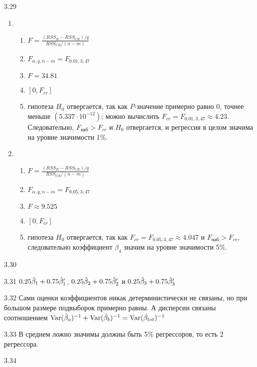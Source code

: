 \begin{solution}{{3.29}}
\begin{enumerate}
\item
\begin{enumerate}
\item $F =\frac{(RSS_R-RSS_{UR})/q}{RSS_{UR}/(n-m)}$
\item $F_{\alpha,q,n-m}=F_{0.01,3,47}$
\item $F=34.81$
\item $[0,F_{cr}]$
\item гипотеза $H_0$ отвергается, так как $P$-значение примерно равно $0$, точнее меньше $(5.337\cdot 10^{-12})$; можно вычислить $F_{cr}=F_{0.01,3,47} \approx 4.23$. Следовательно, $F_{\text{наб}}>F_{cr}$ и $H_0$ отвергается, и регрессия в целом значима на уровне значимости 1\%.
\end{enumerate}

\item
\begin{enumerate}
\item $F =\frac{(RSS_R-RSS_{UR})/q}{RSS_{UR}/(n-m)}$
\item $F_{\alpha,q,n-m}=F_{0.05,3,47}$
\item $F\approx 9.525$
\item $[0,F_{cr}]$
\item гипотеза $H_0$ отвергается, так как $F_{cr}=F_{0.05,3,47} \approx 4.047$ и $F_{\text{наб}}>F_{cr}$, следовательно коэффициент $\beta_4$ значим на уровне значимости 5\%.
\end{enumerate}
\end{enumerate}
\end{solution}
\protect \hypertarget {soln:3.30}{}
\begin{solution}{{3.30}}
\end{solution}
\protect \hypertarget {soln:3.31}{}
\begin{solution}{{3.31}}
$0.25\hat{\beta}_1+0.75\hat{\beta}_1'$, $0.25\hat{\beta}_2+0.75\hat{\beta}_2'$ и $0.25\hat{\beta}_3+0.75\hat{\beta}_3'$
\end{solution}
\protect \hypertarget {soln:3.32}{}
\begin{solution}{{3.32}}
Сами оценки коэффициентов никак детерминистически не связаны, но при большом размере подвыборок примерно равны. А дисперсии связаны соотношением $\operatorname{Var}(\hat{\beta}_a)^{-1}+\operatorname{Var}(\hat{\beta}_b)^{-1}=\operatorname{Var}(\hat{\beta}_{tot})^{-1}$
\end{solution}
\protect \hypertarget {soln:3.33}{}
\begin{solution}{{3.33}}
В среднем ложно значимы должны быть 5\% регрессоров, то есть 2 регрессора.
\end{solution}
\protect \hypertarget {soln:3.34}{}
\begin{solution}{{3.34}}
\end{solution}
